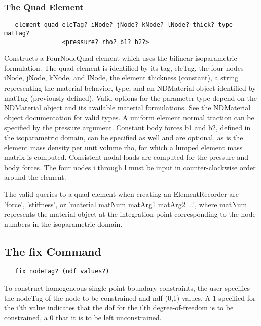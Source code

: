 \documentclass[12pt]{article}
\begin{document}

\subsubsection{The Quad Element}
{\sf\small
\begin{verbatim}
   element quad eleTag? iNode? jNode? kNode? lNode? thick? type matTag? 
                <pressure? rho? b1? b2?>
\end{verbatim}
}

\noindent Constructs a FourNodeQuad element which uses the bilinear
isoparametric formulation. The quad element is identified by its tag,
eleTag, the four nodes iNode, jNode, kNode, and lNode, the element
thickness (constant), a string representing the material behavior,
type, and an NDMaterial object identified by matTag (previously
defined). Valid options for the parameter type depend on the
NDMaterial object and its available material formulations. See the
NDMaterial object documentation for valid types. A uniform element
normal traction can be specified by the pressure argument. Constant
body forces b1 and b2, defined in the isoparametric domain, can be
specified as well and are optional, as is the element mass density per
unit volume rho, for which a lumped element mass matrix is
computed. Consistent nodal loads are computed for the pressure and
body forces. The four nodes i through l must be input in
counter-clockwise order around the element.

The valid queries to a quad element when creating an ElementRecorder
are 'force', 'stiffness', or 'material matNum matArg1 matArg2 ...',  where matNum
represents the material object at the integration point corresponding to the node numbers
in the isoparametric domain.

\subsection{The fix Command}
{\sf\small
\begin{verbatim}
   fix nodeTag? (ndf values?)
\end{verbatim}
}

To construct homogeneous single-point boundary constraints, the user
specifies the nodeTag of the node to be constrained and ndf (0,1)
values. A $1$ specified for the i'th value indicates that the dof for
the i'th degree-of-freedom is to be constrained, a $0$ that it is to be
left unconstrained.
\end{document}
